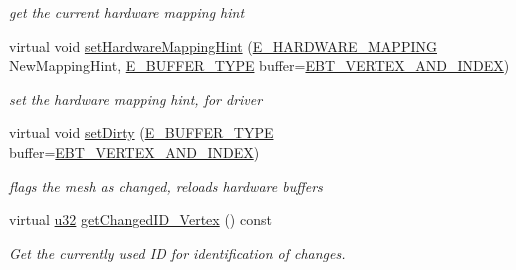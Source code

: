 \begin{DoxyCompactItemize}
\begin{DoxyCompactList}\small\item\em get the current hardware mapping hint \end{DoxyCompactList}\item 
\mbox{\label{structirr_1_1scene_1_1SSharedMeshBuffer_a0e0927ba679258099697688ac123af88}} 
virtual void \hyperlink{structirr_1_1scene_1_1SSharedMeshBuffer_a0e0927ba679258099697688ac123af88}{set\+Hardware\+Mapping\+Hint} (\hyperlink{namespaceirr_1_1scene_ac7d8ee8d77da75f2580bb9bb17231c27}{E\+\_\+\+H\+A\+R\+D\+W\+A\+R\+E\+\_\+\+M\+A\+P\+P\+I\+NG} New\+Mapping\+Hint, \hyperlink{namespaceirr_1_1scene_a8f59a89ffef0ad8e5b2c2cb874a93e8c}{E\+\_\+\+B\+U\+F\+F\+E\+R\+\_\+\+T\+Y\+PE} buffer=\hyperlink{namespaceirr_1_1scene_a8f59a89ffef0ad8e5b2c2cb874a93e8ca34ea664123fbc28610408e51b014dcdd}{E\+B\+T\+\_\+\+V\+E\+R\+T\+E\+X\+\_\+\+A\+N\+D\+\_\+\+I\+N\+D\+EX})
\begin{DoxyCompactList}\small\item\em set the hardware mapping hint, for driver \end{DoxyCompactList}\item 
\mbox{\label{structirr_1_1scene_1_1SSharedMeshBuffer_ab49d4330e436e4e841e28aa867038e22}} 
virtual void \hyperlink{structirr_1_1scene_1_1SSharedMeshBuffer_ab49d4330e436e4e841e28aa867038e22}{set\+Dirty} (\hyperlink{namespaceirr_1_1scene_a8f59a89ffef0ad8e5b2c2cb874a93e8c}{E\+\_\+\+B\+U\+F\+F\+E\+R\+\_\+\+T\+Y\+PE} buffer=\hyperlink{namespaceirr_1_1scene_a8f59a89ffef0ad8e5b2c2cb874a93e8ca34ea664123fbc28610408e51b014dcdd}{E\+B\+T\+\_\+\+V\+E\+R\+T\+E\+X\+\_\+\+A\+N\+D\+\_\+\+I\+N\+D\+EX})
\begin{DoxyCompactList}\small\item\em flags the mesh as changed, reloads hardware buffers \end{DoxyCompactList}\item 
virtual \hyperlink{namespaceirr_a0416a53257075833e7002efd0a18e804}{u32} \hyperlink{structirr_1_1scene_1_1SSharedMeshBuffer_ad9c7307fcad8c9b8db3db98f95863196}{get\+Changed\+I\+D\+\_\+\+Vertex} () const
\begin{DoxyCompactList}\small\item\em Get the currently used ID for identification of changes. \end{DoxyCompactList}\item 

\end{DoxyCompactItemize}
